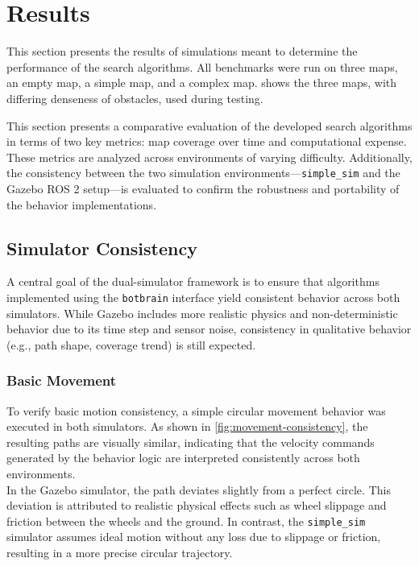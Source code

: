 \section{Results}
\label{sec:results}
This section presents the results of simulations meant to determine the performance of the search algorithms. All benchmarks were run on three maps, an empty map, a simple map, and a complex map.  shows the three maps, with differing denseness of obstacles, used during testing.

This section presents a comparative evaluation of the developed search algorithms in terms of two key metrics: map coverage over time and computational expense. These metrics are analyzed across environments of varying difficulty. 
Additionally, the consistency between the two simulation environments—\texttt{simple\_sim} and the Gazebo ROS 2 setup—is evaluated to confirm the robustness and portability of the behavior implementations.


\subsection{Simulator Consistency}
A central goal of the dual-simulator framework is to ensure that algorithms implemented using the \texttt{botbrain} interface yield consistent behavior across both simulators. While Gazebo includes more realistic physics and non-deterministic behavior due to its time step and sensor noise, consistency in qualitative behavior (e.g., path shape, coverage trend) is still expected.


\subsubsection{Basic Movement}
To verify basic motion consistency, a simple circular movement behavior was executed in both simulators. As shown in \cref{fig:movement-consistency}, the resulting paths are visually similar, indicating that the velocity commands generated by the behavior logic are interpreted consistently across both environments.\\

In the Gazebo simulator, the path deviates slightly from a perfect circle. This deviation is attributed to realistic physical effects such as wheel slippage and friction between the wheels and the ground. In contrast, the \texttt{simple\_sim} simulator assumes ideal motion without any loss due to slippage or friction, resulting in a more precise circular trajectory.\\


